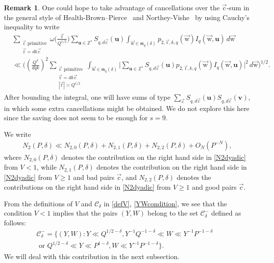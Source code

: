 \documentclass[letterpaper,11pt]{amsart}
\numberwithin{equation}{section}
\theoremstyle{definition}
\newtheorem{remark}[theorem]{Remark}
\numberwithin{equation}{section}
\newcommand{\Z}{\mathbb{Z}}
\newcommand{\uu}{\mathbf{u}}
\renewcommand{\v}{\mathbf{v}}
\newcommand{\ur}{\vec{\mathrm{r}}}
\newcommand{\uw}{{\vec{\mathrm{w}}}}
\newcommand{\uc}{{\vec{\mathrm{c}}}}
\newcommand{\scrm}{\mathfrak{m}}
\begin{document}
\begin{remark}\label{rem:square}
    One could hope to take advantage of cancellations over the \(\uc\)-sum in the general style of Health-Brown--Pierce~\cite{HBP} and Northey-Vishe~\cite{NV} by using Cauchy's inequality  to write 
    \begin{align*}
    &\sum_{\substack{\uc\textrm{ primitive}\\ \ur = dk\uc}}
    \omega\big(\frac{\ur}{Q^{1/2}}\big)
    \sum_{\uu\in \Z^s}
    S_{q,d\uc}(\uu)
    \int_{\uw\in\scrm_q(\delta)}
			p_{2,\ur,k,q}(\uw)I_q(\uw, \uu)\,d\uw
        \\&\ll
 \bigg(       (\frac{Q^{\delta}}{dqk})^2
    \sum_{\substack{\uc\textrm{ primitive}\\ \ur = dk\uc \\ |\ur|\asymp Q^{1/2}}}
    \int_{\uw\in\scrm_q(\delta)}
    \bigg \lvert
\sum_{\uu\in \Z^s}
 S_{q,d\uc}(\uu)
			p_{2,\ur,k,q}(\uw)I_q(\uw, \uu)
    \bigg\rvert^2
    \,d\uw
    \bigg)^{1/2}.    
    \end{align*}
    After bounding the integral, one will have sums of type \(\sum_{\uc}  S_{q,d\uc}(\uu) S_{q,d\uc}(\v)\), in which some extra cancellations might be obtained. We do not explore this here since the saving does not seem to be enough for $s=9$.
\end{remark}
We write 
\begin{align}\label{N2split}
    N_2(P, \delta)\ll N_{2,0}(P, \delta)+N_{2,1}(P, \delta)+N_{2,2}(P, \delta)+O_N(P^{-N}),
\end{align}
where $N_{2,0}(P, \delta)$ denotes the contribution on the right hand side in \eqref{N2dyadic} from $V<1$, while $N_{2,1}(P, \delta)$ denotes the contribution on the right hand side in \eqref{N2dyadic} from $V\geq 1$ and bad pairs $\uc$, and $N_{2,2}(P, \delta)$ denotes the contributions on the right hand side in \eqref{N2dyadic} from $V\geq 1$ and good pairs $\uc$.

From the definitions of $V$ and $\mathcal C_\delta$ in \eqref{defV}, \eqref{YWcondition}, we see that  
the condition $V<1$ implies that the pairs $(Y, W)$ belong to the set $\mathcal C_\delta^-$ defined as follows:
\begin{align}\label{eq:V=0cond}
\mathcal C_\delta^-=\Big\{(Y, W): Y\ll Q^{1/2-\delta}, 
Y^{-1}Q^{-1-\delta}\ll W\ll Y^{-1}P^{-1-\delta} &\\\text{ or }Q^{1/2-\delta}\ll Y\ll P^{1-\delta}, W\ll Y^{-1}P^{-1-\delta}
\Big\}.\nonumber
\end{align}
We will deal with this contribution in the next subsection.
\end{document}
